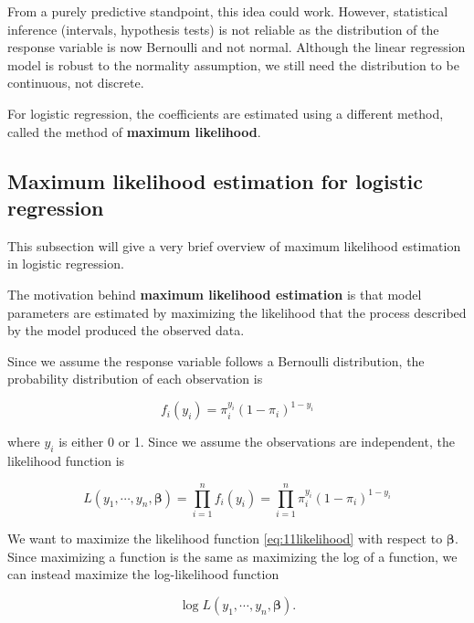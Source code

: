 \documentclass[
]{book}
\begin{document}
From a purely predictive standpoint, this idea could work. However, statistical inference (intervals, hypothesis tests) is not reliable as the distribution of the response variable is now Bernoulli and not normal. Although the linear regression model is robust to the normality assumption, we still need the distribution to be continuous, not discrete.

For logistic regression, the coefficients are estimated using a different method, called the method of \textbf{maximum likelihood}.

\hypertarget{maximum-likelihood-estimation-for-logistic-regression}{%
\subsection{Maximum likelihood estimation for logistic regression}\label{maximum-likelihood-estimation-for-logistic-regression}}

This subsection will give a very brief overview of maximum likelihood estimation in logistic regression.

The motivation behind \textbf{maximum likelihood estimation} is that model parameters are estimated by maximizing the likelihood that the process described by the model produced the observed data.

Since we assume the response variable follows a Bernoulli distribution, the probability distribution of each observation is

\begin{equation} 
f_i(y_i) = \pi_i^{y_i} (1 - \pi_i)^{1-y_i}
\label{eq:11dist}
\end{equation}

where \(y_i\) is either 0 or 1. Since we assume the observations are independent, the likelihood function is

\begin{equation} 
L(y_1, \cdots, y_n, \boldsymbol{\beta}) = \prod_{i=1}^n f_i(y_i) = \prod_{i=1}^n \pi_i^{y_i} (1 - \pi_i)^{1-y_i}
\label{eq:11likelihood}
\end{equation}

We want to maximize the likelihood function \eqref{eq:11likelihood} with respect to \(\boldsymbol{\beta}\). Since maximizing a function is the same as maximizing the log of a function, we can instead maximize the log-likelihood function

\begin{equation}
\log L(y_1, \cdots, y_n, \boldsymbol{\beta}).
\label{eq:11log}
\end{equation}
\end{document}
